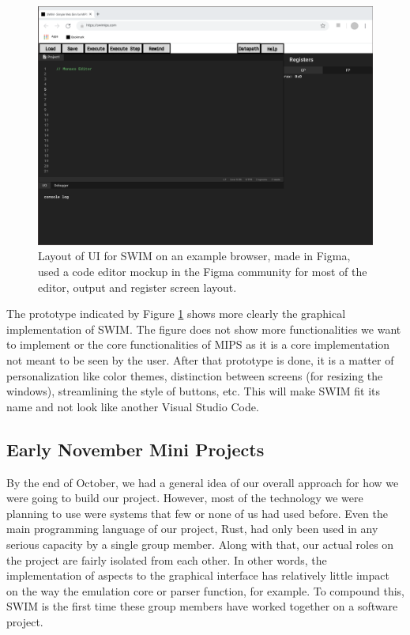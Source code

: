 \documentclass[
    paper=letter,
    parskip=half,
    fontsize=12pt,
    titlepage=firstiscover,
    toc=bibliography,
    numbers=endperiod
]{scrartcl}
\begin{document}
\begin{figure}[H]
    \includegraphics[width=\textwidth]{new-ui-prototype}
    \caption{Layout of UI for SWIM on an example browser, made in Figma, used a code editor mockup in the Figma community for most of the editor, output and register screen layout.}
    \label{fig:new-ui-prototype}
\end{figure}


The prototype indicated by Figure \ref{fig:new-ui-prototype} shows more clearly the
graphical implementation of SWIM. The figure does not show more
functionalities we want to implement or the core functionalities of MIPS
as it is a core implementation not meant to be seen by the user. After
that prototype is done, it is a matter of personalization like color
themes, distinction between screens (for resizing the windows),
streamlining the style of buttons, etc. This will make SWIM fit its name
and not look like another Visual Studio Code.

\subsection{Early November Mini Projects}

By the end of October, we had a general idea of our overall approach for
how we were going to build our project. However, most of the technology
we were planning to use were systems that few or none of us had used
before. Even the main programming language of our project, Rust, had
only been used in any serious capacity by a single group member. Along
with that, our actual roles on the project are fairly isolated from each
other. In other words, the implementation of aspects to the graphical
interface has relatively little impact on the way the emulation core or
parser function, for example. To compound this, SWIM is the first time
these group members have worked together on a software project.
\end{document}
